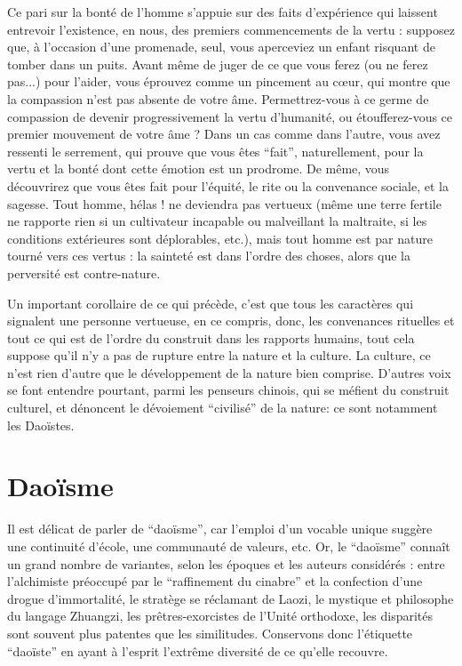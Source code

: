 Ce pari sur la bonté de l'homme s'appuie sur des faits d'expérience qui laissent entrevoir
l'existence, en nous, des premiers commencements de la vertu : supposez que, à
l'occasion d'une promenade, seul, vous aperceviez un enfant risquant de tomber dans un
puits.
Avant même de juger de ce que vous ferez (ou ne ferez pas...) pour l'aider, vous
éprouvez comme un pincement au cœur, qui montre que la compassion n'est pas absente
de votre âme.
Permettrez-vous à ce germe de compassion de devenir progressivement la
vertu d'humanité, ou étoufferez-vous ce premier mouvement de votre âme ? Dans un cas
comme dans l'autre, vous avez ressenti le serrement, qui prouve que vous êtes ``fait'',
naturellement, pour la vertu et la bonté dont cette émotion est un prodrome.
De même,
vous découvrirez que vous êtes fait pour l'équité, le rite ou la convenance sociale, et la
sagesse.
Tout homme, hélas ! ne deviendra pas vertueux (même une terre fertile ne rapporte
rien si un cultivateur incapable ou malveillant la maltraite, si les conditions
extérieures sont déplorables, etc.), mais tout homme est par nature tourné vers ces vertus :
la sainteté est dans l'ordre des choses, alors que la perversité est contre-nature.

Un important corollaire de ce qui précède, c'est que tous les caractères qui signalent une
personne vertueuse, en ce compris, donc, les convenances rituelles et tout ce qui est de
l'ordre du construit dans les rapports humains, tout cela suppose qu'il n'y a pas de rupture
entre la nature et la culture.
La culture, ce n'est rien d'autre que le développement de la nature bien comprise.
D'autres voix se font entendre pourtant, parmi les penseurs chinois,
qui se méfient du construit culturel, et dénoncent le dévoiement ``civilisé'' de la nature:
ce sont notamment les Daoïstes.

\section{Daoïsme}
Il est délicat de parler de ``daoïsme'', car l'emploi d'un vocable unique suggère une
continuité d'école, une communauté de valeurs, etc.
Or, le ``daoïsme'' connaît un grand
nombre de variantes, selon les époques et les auteurs considérés : entre l'alchimiste
préoccupé par le ``raffinement du cinabre'' et la confection d'une drogue d'immortalité, le
stratège se réclamant de Laozi, le mystique et philosophe du langage Zhuangzi, les
prêtres-exorcistes de l'Unité orthodoxe, les disparités sont souvent plus patentes que les
similitudes.
Conservons donc l'étiquette ``daoïste'' en ayant à l'esprit l'extrême diversité
de ce qu'elle recouvre.


